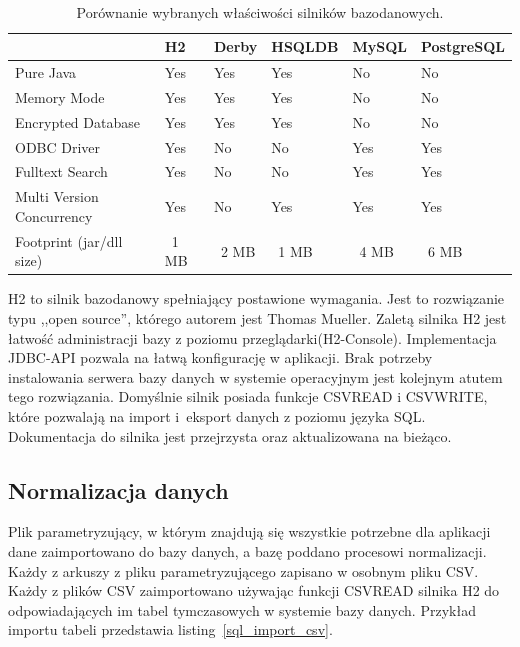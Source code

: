 \begin{table}[h]
 \caption{Porównanie wybranych właściwości silników bazodanowych.}
 \tiny\tt
 \centering
 \vspace{0in}
 \begin{tabular}{|l|l|l|l|l|l|}
 \hline
  & \textbf{H2} & \textbf{Derby} & \textbf{HSQLDB} & \textbf{MySQL} & \textbf{PostgreSQL} \\
 \hline
 Pure Java & Yes & Yes & Yes & No & No \\
 \hline
 Memory Mode & Yes & Yes & Yes & No & No \\
 \hline
 Encrypted Database & Yes & Yes & Yes & No & No \\
 \hline
 ODBC Driver & Yes & No & No & Yes & Yes \\
 \hline
 Fulltext Search & Yes & No & No & Yes & Yes \\
 \hline
 Multi Version Concurrency & Yes & No & Yes & Yes & Yes \\
 \hline
 Footprint (jar/dll size) & ~1 MB & ~2 MB & ~1 MB & ~4 MB & ~6 MB \\
 \hline
 \end{tabular}
 \label{table_h2}
\end{table}

H2 to silnik bazodanowy spełniający postawione wymagania. Jest to rozwiązanie typu ,,open source'', którego autorem jest Thomas Mueller. Zaletą silnika H2 jest łatwość administracji bazy z poziomu przeglądarki(H2-Console). Implementacja JDBC-API pozwala na łatwą konfigurację w aplikacji. Brak potrzeby instalowania serwera bazy danych w systemie operacyjnym jest kolejnym atutem tego rozwiązania. Domyślnie silnik posiada funkcje CSVREAD i CSVWRITE, które pozwalają na import i~eksport danych z poziomu języka SQL. Dokumentacja do silnika jest przejrzysta oraz aktualizowana na bieżąco\cite{h2_reference}.

\subsection{Normalizacja danych}
\label{sec:normalizacjaDanych}

Plik parametryzujący, w którym znajdują się wszystkie potrzebne dla aplikacji dane zaimportowano do bazy danych, a bazę poddano procesowi normalizacji. Każdy z arkuszy z pliku parametryzującego zapisano w osobnym pliku CSV. Każdy z plików CSV zaimportowano używając funkcji CSVREAD silnika H2 do odpowiadających im tabel tymczasowych w systemie bazy danych. Przykład importu tabeli przedstawia listing~\ref{sql_import_csv}.

